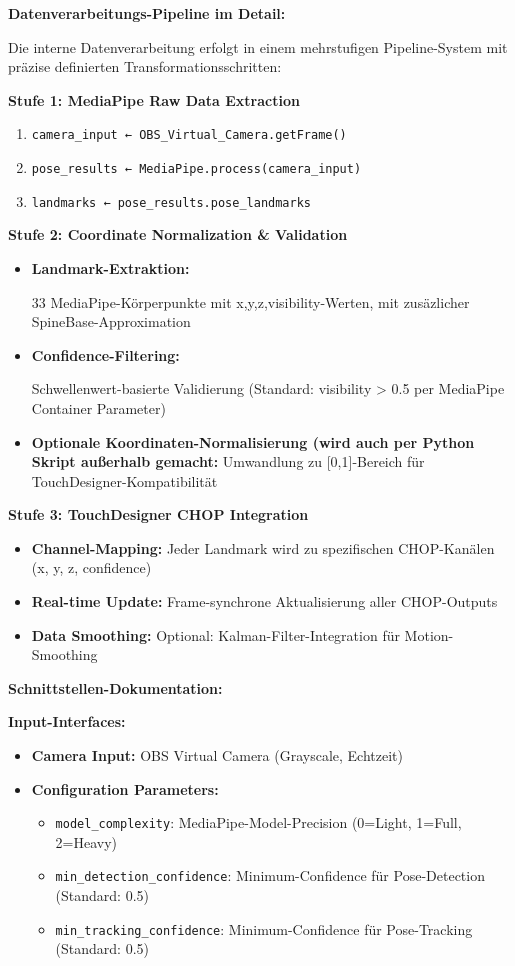 \textbf{Datenverarbeitungs-Pipeline im Detail:}

\raggedright Die interne Datenverarbeitung erfolgt in einem mehrstufigen Pipeline-System mit präzise definierten Transformationsschritten:

\textbf{Stufe 1: MediaPipe Raw Data Extraction}
\begin{enumerate}
    \item \texttt{camera\_input ← OBS\_Virtual\_Camera.getFrame()}
    \item \texttt{pose\_results ← MediaPipe.process(camera\_input)}
    \item \texttt{landmarks ← pose\_results.pose\_landmarks}
\end{enumerate}

\textbf{Stufe 2: Coordinate Normalization \& Validation}
\begin{itemize}
    \item \textbf{Landmark-Extraktion:} \raggedright 33 MediaPipe-Körperpunkte mit x,y,z,visibility-Werten, mit zusäzlicher SpineBase-Approximation
    \item \textbf{Confidence-Filtering:} \raggedright Schwellenwert-basierte Validierung (Standard: visibility > 0.5 per MediaPipe Container Parameter)
    \item \textbf{Optionale Koordinaten-Normalisierung (wird auch per Python Skript außerhalb gemacht:} Umwandlung zu [0,1]-Bereich für TouchDesigner-Kompatibilität
\end{itemize}

\textbf{Stufe 3: TouchDesigner CHOP Integration}
\begin{itemize}
    \item \textbf{Channel-Mapping:} Jeder Landmark wird zu spezifischen CHOP-Kanälen (x, y, z, confidence)
    \item \textbf{Real-time Update:} Frame-synchrone Aktualisierung aller CHOP-Outputs
    \item \textbf{Data Smoothing:} Optional: Kalman-Filter-Integration für Motion-Smoothing
\end{itemize}

\textbf{Schnittstellen-Dokumentation:}

\textbf{Input-Interfaces:}
\begin{itemize}
    \item \textbf{Camera Input:} OBS Virtual Camera (Grayscale, Echtzeit)
    \item \textbf{Configuration Parameters:} 
    \begin{itemize}
        \item \texttt{model\_complexity}: MediaPipe-Model-Precision (0=Light, 1=Full, 2=Heavy)
        \item \texttt{min\_detection\_confidence}: Minimum-Confidence für Pose-Detection (Standard: 0.5)
        \item \texttt{min\_tracking\_confidence}: Minimum-Confidence für Pose-Tracking (Standard: 0.5)
    \end{itemize}
\end{itemize}

